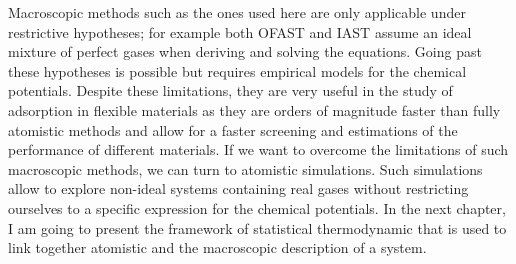 \documentclass[thesis]{subfiles}
\begin{document}
Macroscopic methods such as the ones used here are only applicable under
restrictive hypotheses; for example both OFAST and IAST assume an ideal mixture
of perfect gases when deriving and solving the equations. Going past these
hypotheses is possible but requires empirical models for the chemical
potentials. Despite these limitations, they are very useful in the study of
adsorption in flexible materials as they are orders of magnitude faster than
fully atomistic methods and allow for a faster screening and estimations of the
performance of different materials. If we want to overcome the limitations of
such macroscopic methods, we can turn to atomistic simulations. Such simulations
allow to explore non-ideal systems containing real gases without restricting
ourselves to a specific expression for the chemical potentials. In the next
chapter, I am going to present the framework of statistical thermodynamic that
is used to link together atomistic and the macroscopic description of a system.

\OnlyInSubfile{\printbibliography}
\end{document}
